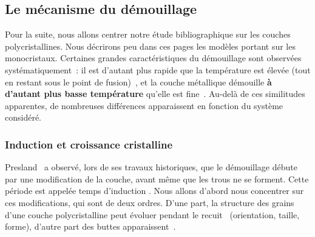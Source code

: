 	\subsection{Le mécanisme du démouillage}
	\label{sBiblioMeca}
Pour la suite, nous allons centrer notre étude bibliographique sur les couches polycristallines. Nous décrirons peu dans ces pages les modèles portant sur les monocristaux. Certaines grandes caractéristiques du démouillage sont observées systématiquement~: il est d'autant plus rapide que la température est élevée (tout en restant sous le point de fusion)~\cite{simrick2012thermal, morawiec2013self}, et la couche métallique démouille \textbf{à d'autant plus basse température} qu'elle est fine~\cite{morawiec2013self, kim2002thickness, manuela2013dewetting}. Au-delà de ces similitudes apparentes, de nombreuses différences apparaissent en fonction du système considéré.\par 
		\subsubsection{Induction et croissance cristalline}

Presland~\cite{presland1972hillock} a observé, lors de ses travaux historiques, que le démouillage débute par une modification de la couche, avant même que les trous ne se forment. Cette période est appelée \og temps d'induction \fg. Nous allons d'abord nous concentrer sur ces modifications, qui sont de deux ordres. D'une part, la structure des grains d'une couche polycristalline peut évoluer pendant le recuit~\cite{thompson1990grain} (orientation, taille, forme), d'autre part des buttes apparaissent~\cite{sharma1980hillock, sharma1986hillock}.\par 

